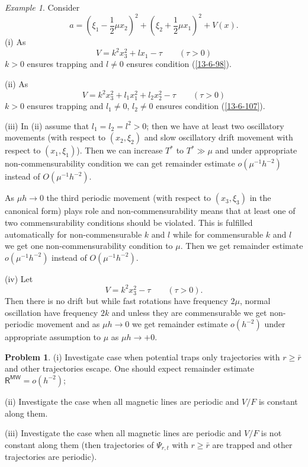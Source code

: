 \documentclass[12pt,oneside,openany,article]{memoir}
\numberwithin{equation}{chapter}
\theoremstyle{plain}
\theoremstyle{definition}
\newtheorem{Problem}[theorem]{Problem}
\theoremstyle{remark}
\newtheorem{example}[theorem]{Example}
\numberwithin{equation}{chapter}
\begin{document}
\begin{example}\label{ex-13-6-34}
Consider
\begin{equation}
a= (\xi_1-\frac{1}{2}\mu x_2)^2 + (\xi_2+\frac{1}{2}\mu x_1)^2 +V(x).
\label{13-6-110}
\end{equation}
(i) As
\begin{equation}
V= k^2 x_3^2 + l x_1 -\tau \qquad (\tau>0)
\label{13-6-111}
\end{equation}
$k>0$ ensures trapping and $l\ne 0$ ensures condition (\ref{13-6-98}).

\medskip\noindent
(ii) As
\begin{equation}
V= k^2 x_3^2 + l_1 x_1^2+l_2 x_2^2-\tau \qquad (\tau>0)
\label{13-6-112}
\end{equation}
$k>0$ ensures trapping and $l_1\ne 0$, $l_2\ne 0$ ensures condition (\ref{13-6-107}).

\medskip\noindent
(iii) In (ii) assume that $l_1=l_2=l^2>0$; then we have at least two oscillatory movements (with respect to $(x_2,\xi_2)$ and slow oscillatory drift movement with respect to $(x_1,\xi_1)$). Then we can increase $T^*$ to $T^*\gg \mu$ and under appropriate non-commensurability condition we can get remainder estimate $o(\mu^{-1}h^{-2})$ instead of $O(\mu^{-1}h^{-2})$.

As $\mu h\to 0$ the third periodic movement (with respect to $(x_3,\xi_3)$ in the canonical form) plays role and non-commensurability means that at least one of two commensurability conditions should be violated. This is fulfilled automatically for non-commensurable $k$ and $l$ while for commensurable $k$ and $l$ we get one non-commensurability condition to $\mu$. Then we get remainder estimate $o(\mu^{-1}h^{-2})$ instead of $O(\mu^{-1}h^{-2})$.

\medskip\noindent
(iv) Let
\begin{equation}
V=k^2 x_3^2-\tau \qquad (\tau>0).
\label{13-6-113}
\end{equation}
Then there is no drift but while fast rotations have frequency $2\mu$, normal oscillation have frequency $2k$ and unless they are commensurable we get non-periodic movement and as $\mu h\to 0$ we get remainder estimate $o(h^{-2})$ under appropriate assumption to $\mu$ as $\mu h \to +0$.
\end{example}

\begin{Problem}\label{problem-13-6-35}
(i) Investigate case when potential traps only trajectories with $r\ge \bar{r}$ and other trajectories escape. One should expect remainder estimate 
${{\mathsf{R}}}^{{\mathsf{MW}}}= o(h^{-2})$;

\medskip\noindent
(ii) Investigate the case when all magnetic lines are periodic and $V/F$ is constant along them.

\medskip\noindent
(iii) Investigate the case when all magnetic lines are periodic and $V/F$ is not constant along them (then trajectories of $\Psi_{r,t}$ with $r\ge \bar{r}$ are trapped and other trajectories are periodic).
\end{Problem}
\end{document}
